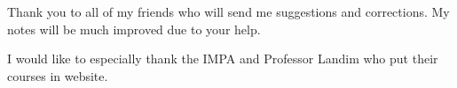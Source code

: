 \documentclass[11pt]{article}
\newcommand{\lecturer}{Claudio Landim}
\newcommand{\notetaker}{Yao Zhang}
\newcounter{lecture} \setcounter{lecture}{0}
\theoremstyle{definition}
\newcommand{\mycopyrightsymbol}{\raisebox{-0.3ex}{\tikz{\node[inner sep=0pt,outer sep=0pt] at (0,0) {\textsc{c}};\draw (0,0) circle (0.18);}}}
\numberwithin{equation}{lecture}
\begin{document}
Thank you to all of my friends  who will send me suggestions and corrections. My notes will be  much improved due to your help.

I would like to especially thank the IMPA and Professor Landim  who put their courses in website.

\medskip

%
%

\newpage


%
%
%

 

 
 


 

 
 

%
% 
%
% 
% 
%
%
% 
%
% 
% 
%
%
%
%
%
%
%
%
%
%
\end{document}
